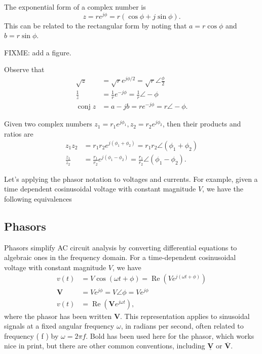 \documentclass[letterpaper]{scrartcl}
\newcommand{\lr}[1]{\left(#1\right)}
\newcommand{\inv}[1]{\frac{1}{#1}}
\DeclareMathOperator{\Real}{Re}
\DeclareMathOperator{\conj}{conj}
\newcommand{\phasor}[1]{\mathbf{#1}}
\begin{document}
The exponential form of a complex number is
\begin{equation}\label{eqn:karlCircuitsCheatSheet:200}
z = r e^{j\phi} = r \lr{ \cos\phi + j \sin\phi }.
\end{equation}
This can be related to the rectangular form by noting that \( a = r \cos\phi \) and \( b = r \sin \phi \).

FIXME: add a figure.

Observe that
\begin{equation}\label{eqn:karlCircuitsCheatSheet:220}
\begin{aligned}
\sqrt{z} &= \sqrt{r} e^{j\phi/2}   = \sqrt{r} \angle \frac{\phi}{2} \\
\inv{z}  &= \inv{r} e^{-j\phi}     = \inv{r} \angle -\phi \\
\conj z &= a - j b = r e^{-j\phi} = r \angle -\phi.
\end{aligned}
\end{equation}

Given two complex numbers \( z_1 = r_1 e^{j\phi_1}, z_2 = r_2 e^{j\phi_2} \), then their products and ratios are
\begin{equation}\label{eqn:karlCircuitsCheatSheet:240}
\begin{aligned}
z_1 z_2         &= r_1 r_2 e^{j \lr{\phi_1 + \phi_2 } }         = r_1 r_2 \angle \lr{ \phi_1 + \phi_2 } \\
\frac{z_1}{z_2} &= \frac{r_1}{r_2} e^{j \lr{\phi_1 - \phi_2 } } = \frac{r_1}{r_2} \angle \lr{ \phi_1 - \phi_2 }.
\end{aligned}
\end{equation}

Let's applying the phasor notation to voltages and currents.  For example, given a time dependent cosinusoidal voltage with constant magnitude \( V \), we have the following equivalences

\subsection*{Phasors}
Phasors simplify AC circuit analysis by converting differential equations to algebraic ones in the frequency domain. For a time-dependent cosinusoidal voltage with constant magnitude \( V \), we have
\begin{equation}\label{eqn:karlCircuitsCheatSheet:260}
\begin{aligned}
v(t)       &= V \cos\lr{ \omega t + \phi } = \Real \lr{ V e^{j \lr{\omega t + \phi} } } \\
\phasor{V} &= V e^{j \phi} = V \angle \phi = V e^{j \phi} \\
v(t)       &= \Real \lr{ \phasor{V} e^{j \omega t} },
\end{aligned}
\end{equation}
where the phasor has been written \( \phasor{V} \).  This representation applies to
sinusoidal signals at a fixed angular frequency \( \omega \), in radians per second, often related to frequency ( f ) by \( \omega = 2 \pi f \).
Bold has been used here for the phasor, which works nice in print, but there are other common conventions, including \(\underline{\phasor{V}}\) or \(\overline{\phasor{V}}\).
\end{document}
